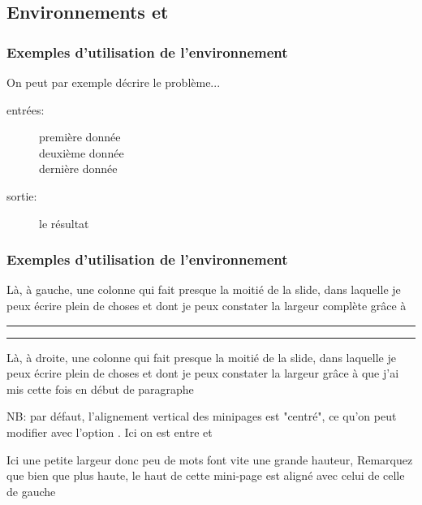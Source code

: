 \subsection{Environnements  et }
\begin{frame}
  \frametitle{Exemples d'utilisation de l'environnement }
  On peut par exemple décrire le problème...
  \begin{description}
    \item[entrées:] première donnée\\
    deuxième donnée\\
    dernière donnée\\
    \item[sortie:] le résultat
  \end{description}
\end{frame}

\begin{frame}
  \frametitle{Exemples d'utilisation de l'environnement }
  
  \begin{minipage}{0.48\textwidth}
    Là, à gauche, une colonne qui fait presque la moitié de la slide, dans laquelle je peux écrire plein de choses et dont je peux constater la largeur complète grâce à 
    \lin{\hrule} \hrule
  \end{minipage}
  \hspace*{0.2cm}
  \begin{minipage}{0.48\textwidth}
    \hrule
    Là, à droite, une colonne qui fait presque la moitié de la slide, dans laquelle je peux écrire plein de choses et dont je peux constater la largeur grâce à \lin{\hrule}
    que j'ai mis cette fois en début de paragraphe
  \end{minipage}

  \vspace*{0.4cm}

  \begin{minipage}[t]{0.64\textwidth}
    NB: par défaut, l'alignement vertical des minipages est "centré", ce qu'on peut modifier avec l'option \lin{[t]}. 
    Ici on est entre 
    et \lin{\end{minipage}}
  \end{minipage}
  \hspace*{0.2cm}
  \begin{minipage}[t]{0.32\textwidth}
    Ici une petite largeur donc peu de mots font vite une grande hauteur,
    Remarquez que bien que plus haute, le haut de cette mini-page est aligné avec celui de celle de gauche
  \end{minipage}
\end{frame}

